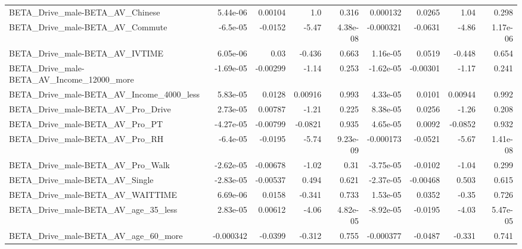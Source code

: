 \begin{tabular}{lrrrrrrrr}
BETA\_Drive\_male-BETA\_AV\_Chinese                    &    5.44e-06 &      0.00104 &       1.0 &    0.316 &   0.000132 &      0.0265 &         1.04 &         0.298 \\
BETA\_Drive\_male-BETA\_AV\_Commute                    &    -6.5e-05 &      -0.0152 &     -5.47 & 4.38e-08 &  -0.000321 &     -0.0631 &        -4.86 &      1.17e-06 \\
BETA\_Drive\_male-BETA\_AV\_IVTIME                     &    6.05e-06 &         0.03 &    -0.436 &    0.663 &   1.16e-05 &      0.0519 &       -0.448 &         0.654 \\
BETA\_Drive\_male-BETA\_AV\_Income\_12000\_more          &   -1.69e-05 &     -0.00299 &     -1.14 &    0.253 &  -1.62e-05 &    -0.00301 &        -1.17 &         0.241 \\
BETA\_Drive\_male-BETA\_AV\_Income\_4000\_less           &    5.83e-05 &       0.0128 &   0.00916 &    0.993 &   4.33e-05 &      0.0101 &      0.00944 &         0.992 \\
BETA\_Drive\_male-BETA\_AV\_Pro\_Drive                  &    2.73e-05 &      0.00787 &     -1.21 &    0.225 &   8.38e-05 &      0.0256 &        -1.26 &         0.208 \\
BETA\_Drive\_male-BETA\_AV\_Pro\_PT                     &   -4.27e-05 &     -0.00799 &   -0.0821 &    0.935 &   4.65e-05 &      0.0092 &      -0.0852 &         0.932 \\
BETA\_Drive\_male-BETA\_AV\_Pro\_RH                     &    -6.4e-05 &      -0.0195 &     -5.74 & 9.23e-09 &  -0.000173 &     -0.0521 &        -5.67 &      1.41e-08 \\
BETA\_Drive\_male-BETA\_AV\_Pro\_Walk                   &   -2.62e-05 &     -0.00678 &     -1.02 &     0.31 &  -3.75e-05 &     -0.0102 &        -1.04 &         0.299 \\
BETA\_Drive\_male-BETA\_AV\_Single                     &   -2.83e-05 &     -0.00537 &     0.494 &    0.621 &  -2.37e-05 &    -0.00468 &        0.503 &         0.615 \\
BETA\_Drive\_male-BETA\_AV\_WAITTIME                   &    6.69e-06 &       0.0158 &    -0.341 &    0.733 &   1.53e-05 &      0.0352 &        -0.35 &         0.726 \\
BETA\_Drive\_male-BETA\_AV\_age\_35\_less                &    2.83e-05 &      0.00612 &     -4.06 & 4.82e-05 &  -8.92e-05 &     -0.0195 &        -4.03 &      5.47e-05 \\
BETA\_Drive\_male-BETA\_AV\_age\_60\_more                &   -0.000342 &      -0.0399 &    -0.312 &    0.755 &  -0.000377 &     -0.0487 &       -0.331 &         0.741 \\

\end{tabular}
